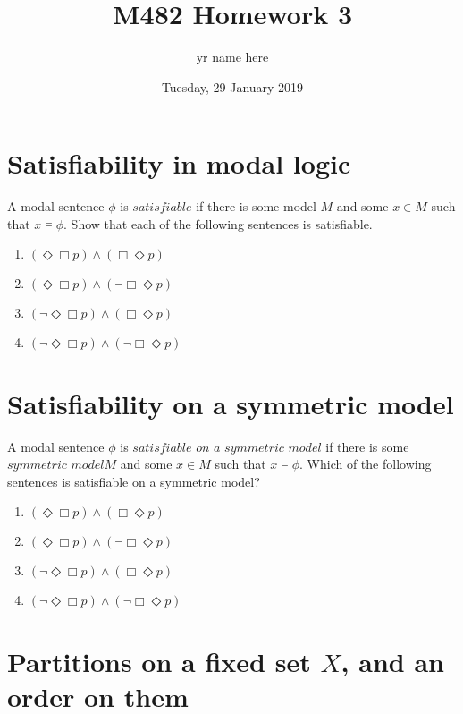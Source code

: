 \documentclass{article}
\title{M482 Homework 3}
\author{yr name here}
\date{Tuesday, 29 January 2019}
\begin{document}
\maketitle

\section{Satisfiability in modal logic}
A modal sentence $\phi$ is $\textit{satisfiable}$ if there is some model $M$ and some $x \in M$ such that $x \models \phi$. Show that each of the following sentences is satisfiable.
\begin{enumerate}
    \item $(\Diamond\Box p) \land (\Box\Diamond p)$
    \item $(\Diamond\Box p) \land (\neg\Box\Diamond p)$
    \item $(\neg\Diamond\Box p) \land (\Box\Diamond p)$
    \item $(\neg\Diamond\Box p) \land (\neg\Box\Diamond p)$
\end{enumerate}


\vspace{1.5in}

\section{Satisfiability on a symmetric model}
A modal sentence $\phi$ is $\textit{satisfiable on a symmetric model}$ if there is some $\textit{symmetric model} M$ and some $x \in M$ such that $x \models \phi$. Which of the following sentences is satisfiable on a symmetric model?

\begin{enumerate}
    \item $(\Diamond\Box p) \land (\Box\Diamond p)$
    \item $(\Diamond\Box p) \land (\neg\Box\Diamond p)$
    \item $(\neg\Diamond\Box p) \land (\Box\Diamond p)$
    \item $(\neg\Diamond\Box p) \land (\neg\Box\Diamond p)$
\end{enumerate}

\vspace{1.5in}

\section{Partitions on a fixed set $X$, and an order on them}
\end{document}
